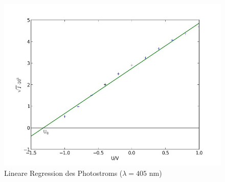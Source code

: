 	\begin{figure}[h]
		\begin{center}
		\includegraphics[scale=0.7]{picavio2lin.jpg}
		\caption{Lineare Regression des Photostroms ($\lambda=405$ nm)}
		\label{picavio2lin}
		\end{center}	
	\end{figure}